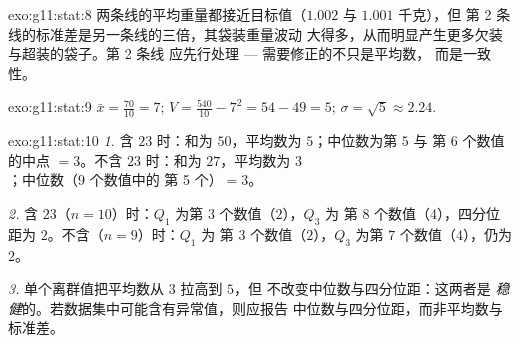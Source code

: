 \begin{solution}{exo:g11:stat:8}
两条线的平均重量都接近目标值（$1.002$ 与 $1.001$ 千克），但
第 2 条线的标准差是另一条线的三倍，其袋装重量波动
大得多，从而明显产生更多欠装与超装的袋子。第 2 条线
应先行处理 --- 需要修正的不只是平均数，
而是一致性。
\end{solution}

\begin{solution}{exo:g11:stat:9}
$\bar x = \frac{70}{10} = 7$;
$V = \frac{540}{10} - 7^2 = 54 - 49 = 5$;
$\sigma = \sqrt5 \approx 2.24$.
\end{solution}

\begin{solution}{exo:g11:stat:10}
\emph{1.} 含 $23$ 时：和为 $50$，平均数为 $5$；中位数为第 $5$ 与
第 $6$ 个数值的中点 $= 3$。不含 $23$ 时：和为 $27$，平均数为 $3$；中位数（9 个数值中的
第 5 个）$= 3$。

\emph{2.} 含 $23$（$n = 10$）时：$Q_1$ 为第 $3$ 个数值（$2$），$Q_3$ 为
第 $8$ 个数值（$4$），四分位距为 $2$。不含（$n = 9$）时：$Q_1$ 为
第 $3$ 个数值（$2$），$Q_3$ 为第 $7$ 个数值（$4$），仍为 $2$。

\emph{3.} 单个离群值把平均数从 $3$ 拉高到 $5$，但
不改变中位数与四分位距：这两者是
\emph{稳健}的。若数据集中可能含有异常值，则应报告
中位数与四分位距，而非平均数与
标准差。
\end{solution}

